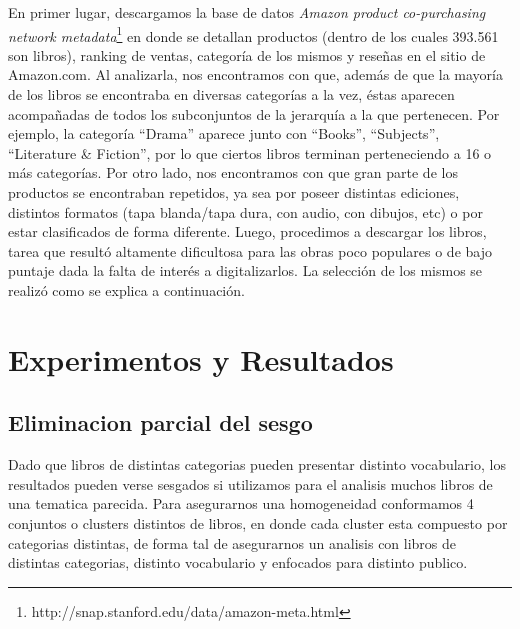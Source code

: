 \documentclass[12pt,journal,compsoc]{IEEEtran}
\begin{document}
En primer lugar, descargamos la base de datos \textit{Amazon product co-purchasing network metadata}\footnote{http://snap.stanford.edu/data/amazon-meta.html} en donde se detallan productos (dentro de los cuales 393.561 son libros), ranking de ventas, categoría de los mismos y reseñas en el sitio de Amazon.com. Al analizarla, nos encontramos con que, además de que la mayoría de los libros se encontraba en diversas categorías a la vez, éstas aparecen acompañadas de todos los subconjuntos de la jerarquía a la que pertenecen. Por ejemplo, la categoría ``Drama'' aparece junto con ``Books'', ``Subjects'', ``Literature \& Fiction'', por lo que ciertos libros terminan perteneciendo a 16 o más categorías. Por otro lado, nos encontramos con que gran parte de los productos se encontraban repetidos, ya sea por poseer distintas ediciones, distintos formatos (tapa blanda/tapa dura, con audio, con dibujos, etc) o por estar clasificados de forma diferente. 
Luego, procedimos a descargar los libros, tarea que resultó altamente dificultosa para las obras poco populares o de bajo puntaje dada la falta de interés a digitalizarlos. La selección de los mismos se realizó como se explica a continuación.

\section{Experimentos y Resultados}

\subsection{Eliminacion parcial del sesgo}

Dado que libros de distintas categorias pueden presentar distinto vocabulario, los resultados pueden verse sesgados si utilizamos para el analisis muchos libros de una tematica parecida. Para asegurarnos una homogeneidad conformamos 4 conjuntos o clusters distintos de libros, en donde cada cluster esta compuesto por categorias distintas, de forma tal de asegurarnos un analisis con libros de distintas categorias, distinto vocabulario y enfocados para distinto publico.
\end{document}
